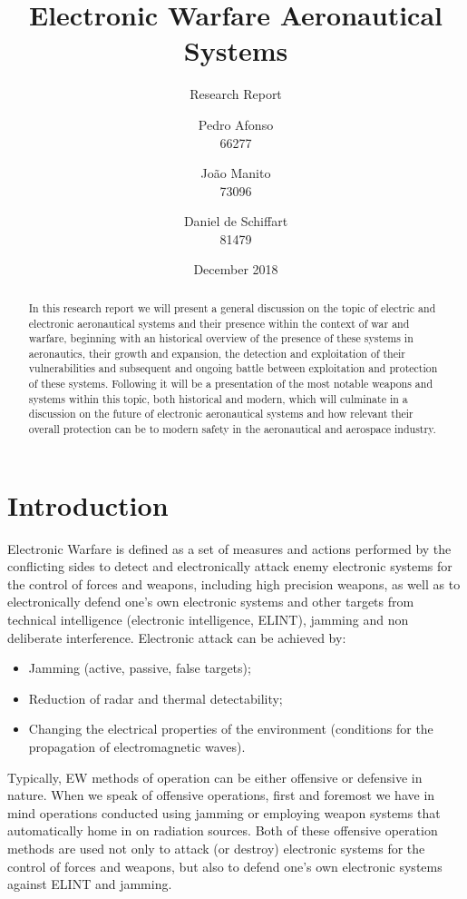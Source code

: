 \documentclass[english,purist]{ist-report}
\author{Pedro Afonso \\ 66277 \and João Manito \\ 73096 \and Daniel de Schiffart \\ 81479}
\title{Electronic Warfare Aeronautical Systems}
\subtitle{Research Report}
\date{December 2018}
\begin{document}
\makecover{}

\begin{abstract}
	In this research report we will present a general discussion on the topic of electric and electronic aeronautical systems and their presence within the context of war and warfare, beginning with an historical overview of the presence of these systems in aeronautics, their growth and expansion, the detection and exploitation of their vulnerabilities and subsequent and ongoing battle between exploitation and protection of these systems. Following it will be a presentation of the most notable weapons and systems within this topic, both historical and modern, which will culminate in a discussion on the future of electronic aeronautical systems and how relevant their overall protection  can be to modern safety in the aeronautical and aerospace industry.
\end{abstract}

{ \tableofcontents}

\pagebreak

\section{Introduction}\label{sec:introduction}
Electronic Warfare is defined as a set of measures and actions
performed by the conflicting sides to detect and electronically attack enemy electronic systems for the control of forces and weapons, including high precision weapons, as well as to electronically defend one's own electronic systems and other targets from technical intelligence (electronic intelligence, ELINT), jamming and non deliberate interference.  
Electronic attack can be achieved by:
\begin{itemize}
    \item Jamming (active, passive, false targets);
    \item Reduction of radar and thermal detectability;
    \item Changing the electrical properties of the environment (conditions
for the propagation of electromagnetic waves). 
\end{itemize}

Typically, EW methods of operation can be either offensive or
defensive in nature. When we speak of offensive operations, first and
foremost we have in mind operations conducted using jamming or employing weapon systems that automatically home in on radiation sources. Both of these offensive operation methods are used not only to attack (or destroy) electronic systems for the control of forces and weapons, but also to defend one's own electronic systems against ELINT and jamming.
\end{document}

